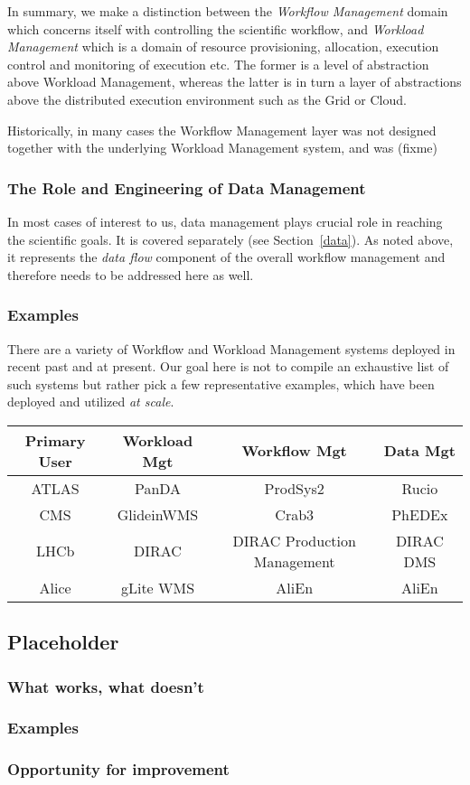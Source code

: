 In summary, we make a distinction between the \textit{Workflow Management} domain which concerns itself with controlling the scientific workflow, and \textit{Workload Management} which
is a domain of resource provisioning, allocation, execution control and monitoring of execution etc. The former is a level of abstraction above Workload Management, whereas the latter is in
turn a layer of abstractions above the distributed execution environment such as the Grid or Cloud.

Historically, in many cases the Workflow Management layer was not designed together with the underlying Workload Management system, and was (fixme)

\subsubsection{The Role and Engineering of Data Management}
In most cases of interest to us, data management plays crucial role in reaching the scientific goals. It is covered separately (see Section~\ref{data}). As noted above, it represents the \textit{data flow} component of the overall workflow management and therefore needs to be addressed here as well.

\subsubsection{Examples}
\label{wms_examples}
There are a variety of Workflow and Workload Management systems deployed in recent past and at present. Our goal here is not to compile an exhaustive list of such systems but rather pick a few representative examples, which have been deployed and utilized \textit{at scale}.


\begin{center}
  \begin{tabular}{ c | c | c | c }
    \hline
    Primary User & Workload Mgt & Workflow Mgt & Data Mgt\\ \hline
    ATLAS & PanDA & ProdSys2 & Rucio\\ \hline
    CMS  & GlideinWMS & Crab3 & PhEDEx\\ \hline
    LHCb  & DIRAC & DIRAC Production Management & DIRAC DMS\\ \hline
    Alice  & gLite WMS & AliEn & AliEn\\ \hline


    \hline
  \end{tabular}
\end{center}

\subsection{Placeholder}
\subsubsection{What works, what doesn't}
\subsubsection{Examples}
\subsubsection{Opportunity for improvement}
